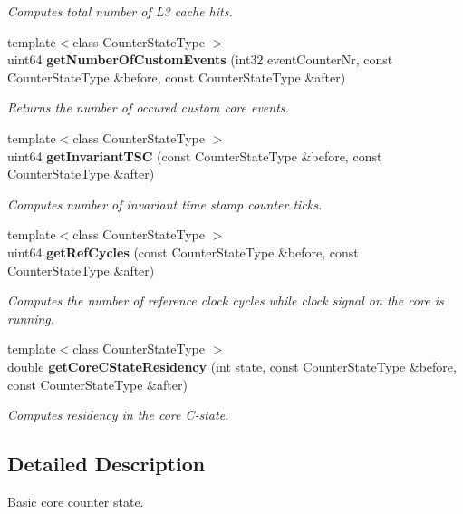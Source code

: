\begin{DoxyCompactItemize}
\begin{DoxyCompactList}\small\item\em Computes total number of L3 cache hits. \end{DoxyCompactList}\item 
{\footnotesize template$<$class Counter\+State\+Type $>$ }\\uint64 {\bf get\+Number\+Of\+Custom\+Events} (int32 event\+Counter\+Nr, const Counter\+State\+Type \&before, const Counter\+State\+Type \&after)
\begin{DoxyCompactList}\small\item\em Returns the number of occured custom core events. \end{DoxyCompactList}\item 
{\footnotesize template$<$class Counter\+State\+Type $>$ }\\uint64 {\bf get\+Invariant\+T\+S\+C} (const Counter\+State\+Type \&before, const Counter\+State\+Type \&after)
\begin{DoxyCompactList}\small\item\em Computes number of invariant time stamp counter ticks. \end{DoxyCompactList}\item 
{\footnotesize template$<$class Counter\+State\+Type $>$ }\\uint64 {\bf get\+Ref\+Cycles} (const Counter\+State\+Type \&before, const Counter\+State\+Type \&after)
\begin{DoxyCompactList}\small\item\em Computes the number of reference clock cycles while clock signal on the core is running. \end{DoxyCompactList}\item 
{\footnotesize template$<$class Counter\+State\+Type $>$ }\\double {\bf get\+Core\+C\+State\+Residency} (int state, const Counter\+State\+Type \&before, const Counter\+State\+Type \&after)
\begin{DoxyCompactList}\small\item\em Computes residency in the core C-\/state. \end{DoxyCompactList}\end{DoxyCompactItemize}


\subsection{Detailed Description}
Basic core counter state. 

